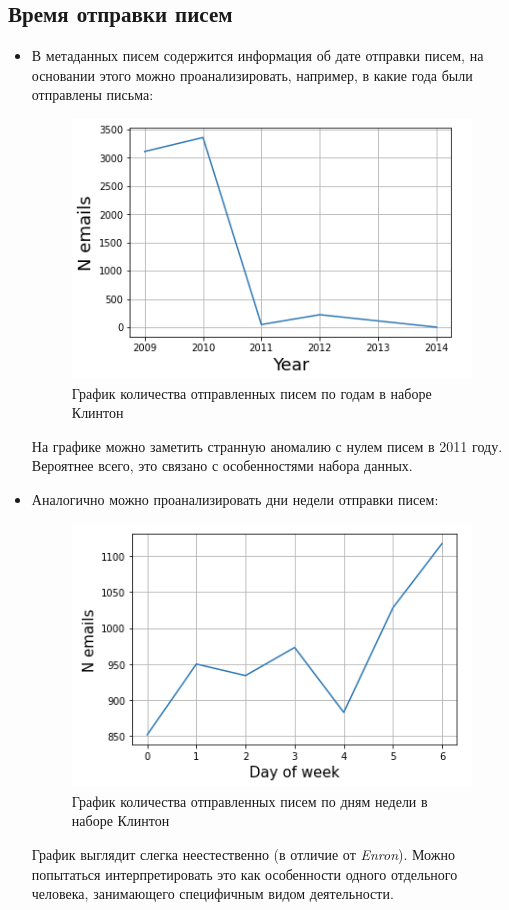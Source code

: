 \subsection{Время отправки писем}


\begin{itemize}

\item В метаданных писем содержится информация об дате отправки писем, на основании этого
можно проанализировать, например, в какие года были отправлены письма:


\begin{figure}[H]
\centering
\includegraphics[scale=0.8]{pics/year.png}
\caption{График количества отправленных писем по годам в наборе Клинтон}
\end{figure}

На графике можно заметить странную аномалию с нулем писем в 2011 году. Вероятнее всего, это связано с особенностями набора данных. 

\item Аналогично можно проанализировать дни недели отправки писем:

\begin{figure}[H]
\centering
\includegraphics[scale=0.8]{pics/week.png}
\caption{График количества отправленных писем по дням недели в наборе Клинтон}
\end{figure}


График выглядит слегка неестественно (в отличие от \textit{Enron}). Можно попытаться интерпретировать это как особенности одного отдельного человека, занимающего специфичным видом деятельности.

 
\end{itemize}
